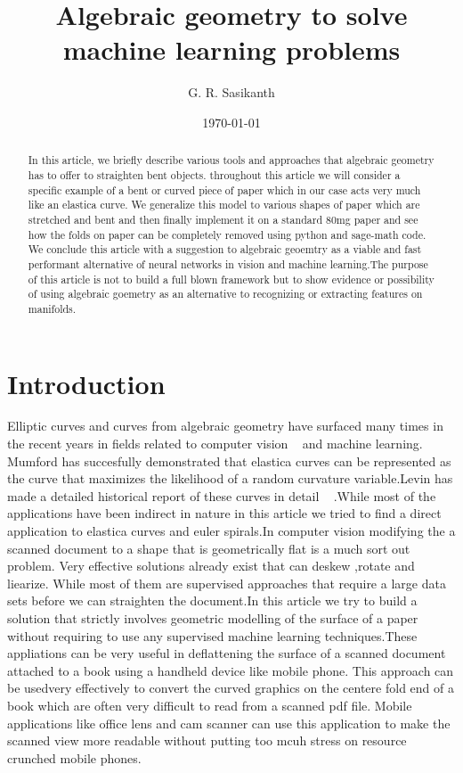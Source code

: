 \documentclass[longbibliography]{revtex4-1}
\begin{document}
\title{Algebraic geometry to solve machine learning problems}
\author{G. R. Sasikanth}
\date{\today}
\begin{abstract}
 In this article, we briefly describe various tools and approaches that algebraic geometry has to offer to straighten bent objects.
 throughout this article we will consider a specific example of a bent or curved piece of paper which in our case acts very much like an     
 elastica curve. We generalize this model to various shapes of paper which are stretched and bent and then finally implement it on 
 a standard 80mg paper and see how the folds on paper can be completely removed using python and sage-math code. We conclude this article
 with a suggestion to algebraic geoemtry as a viable and fast performant alternative of neural networks in vision and
 machine learning.The purpose of this article is not to build a full blown framework but to show evidence or possibility of using 
 algebraic goemetry as an alternative to recognizing or extracting features on manifolds.
\end{abstract}
\maketitle

\section{Introduction}
Elliptic curves and curves from algebraic geometry have surfaced many times in the recent years in fields related to computer vision ~\cite{Mumford} and machine learning. Mumford has succesfully demonstrated that elastica curves can be represented as the curve that maximizes the likelihood of a random curvature variable.Levin has made a detailed historical report of these curves in detail ~\cite{Levien} .While most of the applications have been indirect in nature in this article we tried to find a direct application to
elastica curves and euler spirals.In computer vision modifying the a scanned document to a shape that is geometrically flat is a much sort out problem. Very effective solutions already exist that can deskew ,rotate and liearize. While most of them are supervised approaches that require a large data sets before we can straighten the document.In this article we try to build a solution that strictly involves geometric modelling of the surface of a paper without requiring to use any supervised machine learning techniques.These appliations can be very useful in deflattening the surface of a scanned document attached to a book using a handheld device like mobile phone. This approach can be usedvery effectively to convert the curved graphics on the centere fold end of a book which are often very difficult to read from a scanned pdf file. Mobile applications like office lens and cam scanner can use this application to make the scanned view more readable without putting too mcuh stress on resource crunched mobile phones.
\end{document}
